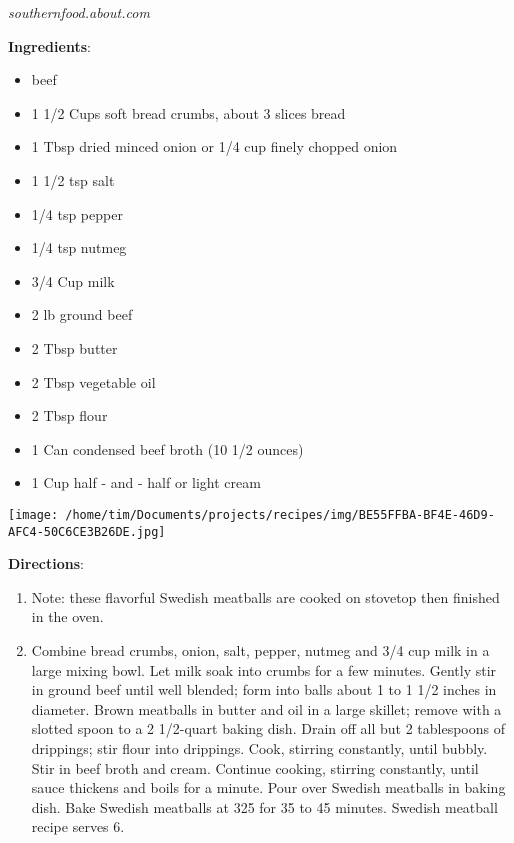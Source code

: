 \documentclass[11pt, twoside, openany]{book}
\begin{document}
 \label{swedish-meatballs}\hfill\textit{southernfood.about.com}\\
\begin{minipage}[t]{0.8\linewidth}
\textbf{Ingredients}:\vspace{-3mm}
\begin{multicols}{2}
\begin{itemize}\setlength\itemsep{-1mm}
\item beef
\item 1 1/2 Cups soft bread crumbs, about 3 slices bread
\item 1 Tbsp dried minced onion or 1/4 cup finely chopped onion
\item 1 1/2 tsp salt
\item 1/4 tsp pepper
\item 1/4 tsp nutmeg
\item 3/4 Cup milk
\item 2 lb ground beef
\item 2 Tbsp butter
\item 2 Tbsp vegetable oil
\item 2 Tbsp flour
\item 1 Can condensed beef broth (10 1/2 ounces)
\item 1 Cup half - and - half or light cream
\end{itemize}
\end{multicols}
\end{minipage}
\begin{minipage}[t]{0.2\linewidth}
\centering \strut\vspace*{-\baselineskip}\newline
\texttt{[image: /home/tim/Documents/projects/recipes/img/BE55FFBA-BF4E-46D9-AFC4-50C6CE3B26DE.jpg]}\\
\end{minipage}\vspace{3mm}
\textbf{Directions}:
\vspace{-3mm}\begin{enumerate}\setlength\itemsep{-1mm}
\item Note: these flavorful Swedish meatballs are cooked on stovetop then finished in the oven.
\item Combine bread crumbs, onion, salt, pepper, nutmeg and 3/4 cup milk in a large mixing bowl. Let milk soak into crumbs for a few minutes. Gently stir in ground beef until well blended; form into balls about 1 to 1 1/2 inches in diameter. Brown meatballs in butter and oil in a large skillet; remove with a slotted spoon to a 2 1/2-quart baking dish. Drain off all but 2 tablespoons of drippings; stir flour into drippings. Cook, stirring constantly, until bubbly. Stir in beef broth and cream. Continue cooking, stirring constantly, until sauce thickens and boils for a minute. Pour over Swedish meatballs in baking dish. Bake Swedish meatballs at 325 for 35 to 45 minutes. Swedish meatball recipe serves 6.
\end{enumerate}
\end{document}
